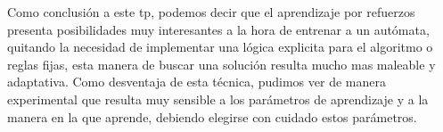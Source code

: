 Como conclusión a este tp, podemos decir que el aprendizaje por refuerzos presenta posibilidades muy interesantes a la hora de entrenar a un autómata, quitando la necesidad de implementar una lógica explicita para el algoritmo o reglas fijas, esta manera de buscar una solución resulta mucho mas maleable y adaptativa. Como desventaja de esta técnica, pudimos ver de manera experimental que resulta muy sensible a los parámetros de aprendizaje y a la manera en la que aprende, debiendo elegirse con cuidado estos parámetros.